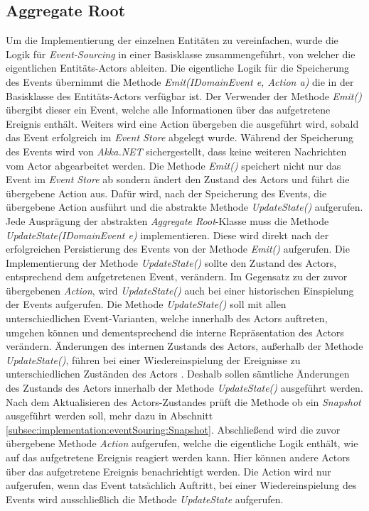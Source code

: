 \subsection{Aggregate Root}
Um die Implementierung der einzelnen Entitäten zu vereinfachen, wurde die Logik für \textit{Event-Sourcing} in einer Basisklasse zusammengeführt, von welcher die eigentlichen Entitäts-Actors ableiten. 
Die eigentliche Logik für die Speicherung des Events übernimmt die Methode \textit{Emit(IDomainEvent e, Action a)} die in der Basisklasse des Entitäts-Actors verfügbar ist. Der Verwender der Methode \textit{Emit()} übergibt dieser ein Event, welche alle Informationen über das aufgetretene Ereignis enthält. Weiters wird eine Action übergeben die ausgeführt wird, sobald das Event erfolgreich im \textit{Event Store} abgelegt wurde. Während der Speicherung des Events wird von \textit{Akka.NET} sichergestellt, dass keine weiteren Nachrichten vom Actor abgearbeitet werden. Die Methode \textit{Emit()} speichert nicht nur das Event im \textit{Event Store} ab sondern ändert den Zustand des Actors und führt die übergebene Action aus. Dafür wird, nach der Speicherung des Events, die übergebene Action ausführt und die abstrakte Methode \textit{UpdateState()} aufgerufen. \\
Jede Ausprägung der abstrakten \textit{Aggregate Root}-Klasse muss die Methode \textit{UpdateState(IDomainEvent e)} implementieren. Diese wird direkt nach der erfolgreichen Persistierung des Events von der Methode \textit{Emit()} aufgerufen. Die Implementierung der Methode \textit{UpdateState()} sollte den Zustand des Actors, entsprechend dem aufgetretenen Event, verändern. Im Gegensatz zu der zuvor übergebenen \textit{Action}, wird \textit{UpdateState()} auch bei einer historischen Einspielung der Events aufgerufen. Die Methode \textit{UpdateState()} soll mit allen unterschiedlichen Event-Varianten, welche innerhalb des Actors auftreten, umgehen können und dementsprechend die interne Repräsentation des Actors verändern. Änderungen des internen Zustands des Actors, außerhalb der Methode \textit{UpdateState()}, führen bei einer Wiedereinspielung der Ereignisse zu unterschiedlichen Zuständen des Actors . Deshalb sollen sämtliche Änderungen des Zustands des Actors innerhalb der Methode \textit{UpdateState()} ausgeführt werden. \\
Nach dem Aktualisieren des Actors-Zustandes prüft die Methode ob ein \textit{Snapshot} ausgeführt werden soll, mehr dazu in Abschnitt \ref{subsec:implementation:eventSouring:Snapshot}. Abschließend wird die zuvor übergebene Methode \textit{Action} aufgerufen, welche die eigentliche Logik enthält, wie auf das aufgetretene Ereignis reagiert werden kann. Hier können andere Actors über das aufgetretene Ereignis benachrichtigt werden. Die Action wird nur aufgerufen, wenn das Event tatsächlich Auftritt, bei einer Wiedereinspielung des Events wird ausschließlich die Methode \textit{UpdateState} aufgerufen. \\ 

